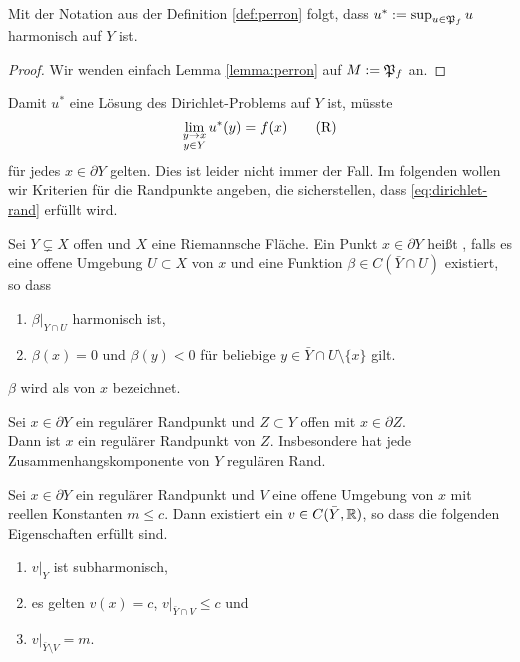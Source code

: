\begin{cor}
  Mit der Notation aus der Definition \ref{def:perron} folgt, dass $u^\ast := \sup_{u
    \in \mathfrak{P}_f} u$ harmonisch auf $Y$ ist.
\end{cor}

\begin{proof}
  Wir wenden einfach Lemma \ref{lemma:perron} auf $M := \mathfrak{P}_f$ an.
\end{proof}

\begin{rem}
  Damit $u^\ast$ eine Lösung des Dirichlet-Problems auf $Y$ ist,
  müsste
  \[
  \lim_{\substack{y\rightarrow x\\y \in Y}}u^\ast(y) =
  f(x) \label{eq:dirichlet-rand} \tag{R}
  \]
  für jedes $x \in \partial Y$ gelten. Dies ist leider nicht immer der
  Fall. Im folgenden wollen wir Kriterien für die Randpunkte angeben,
  die sicherstellen, dass \eqref{eq:dirichlet-rand} erfüllt wird.
\end{rem}

\begin{defin}
  Sei $Y \subsetneq X$ offen und $X$ eine Riemannsche Fläche. Ein
  Punkt $x \in \partial Y$ heißt , falls es eine
  offene Umgebung $U \subset X$ von $x$ und eine Funktion $\beta  \in
  C(\bar Y \cap U)$ existiert, so dass
  \begin{enumerate}
  \item $\beta|_{Y \cap U}$ harmonisch ist,
  \item $\beta(x) =0$ und $\beta(y) < 0$ für beliebige $y \in \bar Y
    \cap U \setminus \{x\}$ gilt.
  \end{enumerate}
  $\beta$ wird als  von $x$ bezeichnet.
\end{defin}

\begin{cor}
  Sei $x \in \partial Y$ ein regulärer Randpunkt und $Z \subset Y$
  offen mit $x \in \partial Z$.\\
  Dann ist $x$ ein regulärer Randpunkt von $Z$. Insbesondere hat jede
  Zusammenhangskomponente von $Y$ regulären Rand.
\end{cor}

\begin{lemma}
  \label{lemma:regulär-trennen}
  Sei $x \in \partial Y$ ein regulärer Randpunkt und $V$ eine offene
  Umgebung von $x$ mit reellen Konstanten $m \leq c$. Dann existiert
  ein $v \in C( \bar Y, \mathbb{R})$, so dass die folgenden Eigenschaften
  erfüllt sind.
  \begin{enumerate}
  \item $v|_Y$ ist subharmonisch,
  \item es gelten $v(x) = c$, $v|_{\bar Y \cap V} \leq c$ und
  \item $v|_{\bar Y\setminus V} = m$.
  \end{enumerate}
\end{lemma}

